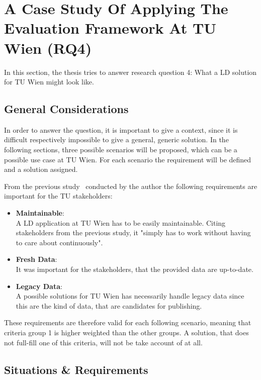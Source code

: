 \chapter{A Case Study Of Applying The Evaluation Framework At TU Wien (RQ4)}\label{ch:tuwien}

In this section, the thesis tries to answer research question 4: What a LD 
solution for TU Wien might look like.

\section{General Considerations}
In order to answer the question, it is important to give a context, since it is 
difficult respectively impossible to give a general, generic solution. In the 
following sections, three possible scenarios will be proposed, which can be a 
possible use case at TU Wien. For each scenario the requirement will be defined 
and a solution assigned.

From the previous study~\cite{baronyai_publishing_2016} conducted by the author 
the following requirements are important for the TU stakeholders:

\begin{itemize}

\item \textbf{Maintainable}: \\
A LD application at TU Wien has to be easily maintainable. Citing stakeholders 
from the previous study, it "simply has to work without having to care about 
continuously".

\item \textbf{Fresh Data}: \\
It was important for the stakeholders, that the provided data are up-to-date.

\item \textbf{Legacy Data}: \\
A possible solutions for TU Wien has necessarily handle legacy data since this are 
the kind of data, that are candidates for publishing.

\end{itemize}

These requirements are therefore valid for each following scenario, meaning that 
criteria group 1 is higher weighted than the other groups. A solution, that does 
not full-fill one of this criteria, will not be take account of at all.

\section{Situations \& Requirements}

